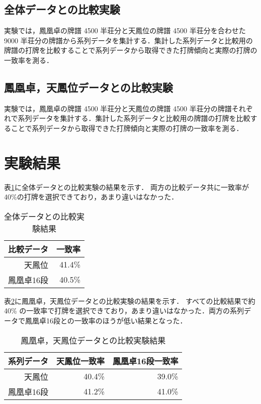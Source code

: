 \documentclass[a4j]{jarticle}
\begin{document}
\begin{Abstract}
\subsection{全体データとの比較実験}
 実験では，鳳凰卓の牌譜 4500 半荘分と天鳳位の牌譜 4500 半荘分を合わせた9000 半荘分の牌譜から系列データを集計する．集計した系列データと比較用の牌譜の打牌を比較することで系列データから取得できた打牌傾向と実際の打牌の一致率を測る．
 
\subsection{鳳凰卓，天鳳位データとの比較実験}
 実験では，鳳凰卓の牌譜 4500 半荘分と天鳳位の牌譜 4500 半荘分の牌譜それぞれで系列データを集計する．集計した系列データと比較用の牌譜の打牌を比較することで系列データから取得できた打牌傾向と実際の打牌の一致率を測る．

\section{実験結果}
 表\ref{tab:exp1_result}に全体データとの比較実験の結果を示す．
 両方の比較データ共に一致率が40\%の打牌を選択できており，あまり違いはなかった．
 
  \begin{table}[h]
   \vspace{-1.5zh}
  \begin{center}
   \caption{全体データとの比較実験結果}
   \label{tab:exp1_result}
    \vspace{0.3zh}
   \begin{tabular}{r||r} \hline \hline
	比較データ&一致率 \\ \hline
	天鳳位 & 41.4\% \\ \hline
	鳳凰卓16段&  40.5\% \\ \hline
   \end{tabular}
  \end{center}
 \end{table}
 \vspace{-2.0zh}
 表\ref{tab:exp2_result}に鳳凰卓，天鳳位データとの比較実験の結果を示す．
 すべての比較結果で約40\% の一致率で打牌を選択できており，あまり違いはなかった．両方の系列データで鳳凰卓16段との一致率のほうが低い結果となった．
 
  \begin{table}[h]
   \vspace{-1.5zh}
  \begin{center}
   \caption{鳳凰卓，天鳳位データとの比較実験結果}
   \label{tab:exp2_result}
    \vspace{0.3zh}
   \begin{tabular}{r||r|r} \hline \hline
	系列データ&天鳳位一致率&鳳凰卓16段一致率 \\ \hline
	天鳳位 & 40.4\%& 39.0\% \\ \hline
	鳳凰卓16段 & 41.2\%&  41.0\% \\ \hline
   \end{tabular}
  \end{center}
 \end{table}
 \vspace{-2.0zh}
 

\end{Abstract}
\end{document}

